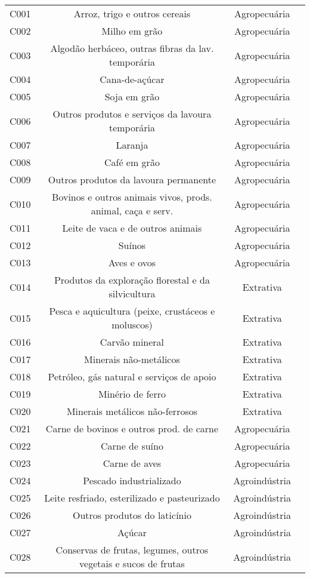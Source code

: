 \begin{apendicesenv}
\begin{small}
\begin{center}
\begin{longtable}{lccc}
				C001 & Arroz, trigo e outros cereais & Agropecuária \\
				C002 & Milho em grão & Agropecuária \\
				C003 & Algodão herbáceo, outras fibras da lav. temporária & Agropecuária \\
				C004 & Cana-de-açúcar & Agropecuária \\
				C005 & Soja  em grão & Agropecuária \\
				C006 & Outros produtos e serviços da lavoura temporária & Agropecuária \\
				C007 & Laranja & Agropecuária \\
				C008 & Café em grão & Agropecuária \\
				C009 & Outros produtos da lavoura permanente & Agropecuária \\
				C010 & Bovinos e outros animais vivos, prods. animal, caça e serv. & Agropecuária \\
				C011 & Leite de vaca e de outros animais & Agropecuária \\
				C012 & Suínos & Agropecuária \\
				C013 & Aves e ovos & Agropecuária \\
				C014 & Produtos da exploração florestal e da silvicultura & Extrativa \\
				C015 & Pesca e aquicultura (peixe, crustáceos e moluscos) & Extrativa \\
				C016 & Carvão mineral & Extrativa \\
				C017 & Minerais não-metálicos & Extrativa \\
				C018 & Petróleo, gás natural e serviços de apoio & Extrativa \\
				C019 & Minério de ferro & Extrativa \\
				C020 & Minerais metálicos não-ferrosos & Extrativa \\
				C021 & Carne de bovinos e outros prod. de carne & Agropecuária \\
				C022 & Carne de suíno & Agropecuária \\
				C023 & Carne de aves & Agropecuária \\
				C024 & Pescado industrializado & Agroindústria \\
				C025 & Leite resfriado, esterilizado e pasteurizado & Agroindústria \\
				C026 & Outros produtos do laticínio & Agroindústria \\
				C027 & Açúcar & Agroindústria \\
				C028 & Conservas de frutas, legumes, outros vegetais e sucos de frutas & Agroindústria \\

\end{longtable}
\end{center}
\end{small}
\end{apendicesenv}
